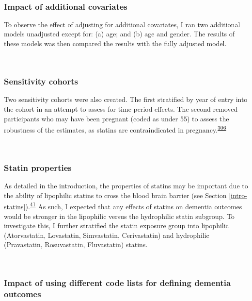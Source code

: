 \documentclass[a4paper, twoside]{templates/ociamthesis}
\begin{document}
~

\hypertarget{impact-of-additional-covariates}{%
\subsubsection{Impact of additional covariates}\label{impact-of-additional-covariates}}

To observe the effect of adjusting for additional covariates, I ran two additional models unadjusted except for: (a) age; and (b) age and gender. The results of these models was then compared the results with the fully adjusted model.

~

\hypertarget{sensitivity-cohorts}{%
\subsubsection{Sensitivity cohorts}\label{sensitivity-cohorts}}

Two sensitivity cohorts were also created. The first stratified by year of entry into the cohort in an attempt to assess for time period effects. The second removed participants who may have been pregnant (coded as under 55) to assess the robustness of the estimates, as statins are contraindicated in pregnancy.\textsuperscript{\protect\hyperlink{ref-karalis2016}{306}}

~

\hypertarget{statin-properties}{%
\subsubsection{Statin properties}\label{statin-properties}}

As detailed in the introduction, the properties of statins may be important due to the ability of lipophilic statins to cross the blood brain barrier (see Section \ref{intro-statins}).\textsuperscript{\protect\hyperlink{ref-sierra2011}{41}} As such, I expected that any effects of statins on dementia outcomes would be stronger in the lipophilic versus the hydrophilic statin subgroup. To investigate this, I further stratified the statin exposure group into lipophilic (Atorvastatin, Lovastatin, Simvastatin, Cerivastatin) and hydrophilic (Pravastatin, Rosuvastatin, Fluvastatin) statins.

~

\hypertarget{impact-of-using-different-code-lists-for-defining-dementia-outcomes}{%
\subsubsection{Impact of using different code lists for defining dementia outcomes}\label{impact-of-using-different-code-lists-for-defining-dementia-outcomes}}
\end{document}
